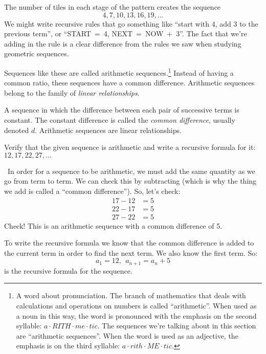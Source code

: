 The number of tiles in each stage of the pattern creates the sequence \[4, 7, 10, 13, 16, 19, \dotsc\] We might write recursive rules that go something like ``start with 4, add 3 to the previous term'', or ``START~=~4, NEXT~=~NOW~+~3''. The fact that we're adding in the rule is a clear difference from the rules we saw when studying geometric sequences.


Sequences like these are called \glspl{arithmetic sequence}.\footnote{A word about pronunciation. The branch of mathematics that deals with calculations and operations on numbers is called ``arithmetic''. When used as a noun in this way, the word is pronounced with the emphasis on the second syllable: $a \cdot RITH \cdot me \cdot tic$. The sequences we're talking about in this section are ``arithmetic sequences''. When the word is used as an adjective, the emphasis is on the third syllable: $a \cdot rith \cdot ME \cdot tic$.} Instead of having a common ratio, these sequences have a \gls{common difference}. Arithmetic sequences belong to the family of \textit{linear relationships}.

\begin{boxdef}
A sequence in which the difference between each pair of successive terms is constant. The constant difference is called the \textit{common difference}, usually denoted $d$. Arithmetic sequences are linear relationships.
\end{boxdef}

\begin{boxex}
Verify that the given sequence is arithmetic and write a recursive formula for it: $12, 17, 22, 27, \dotsc$

\exsoln\ In order for a sequence to be arithmetic, we must add the same quantity as we go from term to term. We can check this by subtracting (which is why the thing we add is called a ``common difference''). So, let's check: \[\begin{aligned}17-12 &= 5\\22-17 &= 5\\27-22 &= 5\end{aligned}\]
Check! This is an arithmetic sequence with a common difference of 5.

To write the recursive formula we know that the common difference is added to the current term in order to find the next term. We also know the first term. So: \[a_1 = 12, ~~ a_{n+1} = a_n + 5\]
is the recursive formula for the sequence.
\end{boxex}

